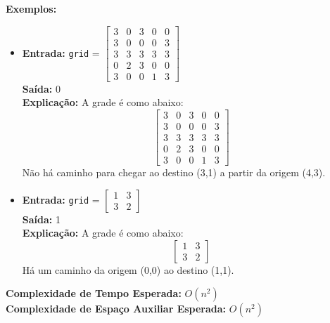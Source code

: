 \documentclass[a4paper,12pt]{article}
\begin{document}
\begin{enumerate}
\textbf{Exemplos:}
\begin{itemize}
    \item \textbf{Entrada:} \texttt{grid} = \(\begin{bmatrix}3 & 0 & 3 & 0 & 0\\3 & 0 & 0 & 0 & 3\\3 & 3 & 3 & 3 & 3\\0 & 2 & 3 & 0 & 0\\3 & 0 & 0 & 1 & 3\end{bmatrix}\) \\
    \textbf{Saída:} 0 \\
    \textbf{Explicação:} A grade é como abaixo: \\
    \[
    \begin{bmatrix}
    3 & 0 & 3 & 0 & 0 \\
    3 & 0 & 0 & 0 & 3 \\
    3 & 3 & 3 & 3 & 3 \\
    0 & 2 & 3 & 0 & 0 \\
    3 & 0 & 0 & 1 & 3
    \end{bmatrix}
    \]
    Não há caminho para chegar ao destino (3,1) a partir da origem (4,3).
    
    \item \textbf{Entrada:} \texttt{grid} = \(\begin{bmatrix}1 & 3\\3 & 2\end{bmatrix}\) \\
    \textbf{Saída:} 1 \\
    \textbf{Explicação:} A grade é como abaixo: \\
    \[
    \begin{bmatrix}
    1 & 3 \\
    3 & 2
    \end{bmatrix}
    \]
    Há um caminho da origem (0,0) ao destino (1,1).
\end{itemize}

\textbf{Complexidade de Tempo Esperada:} \( O(n^2) \) \\
\textbf{Complexidade de Espaço Auxiliar Esperada:} \( O(n^2) \)

    
\end{enumerate}
\end{document}
